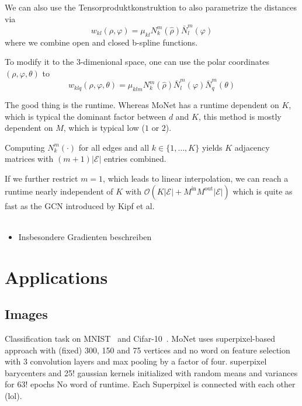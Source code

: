 \documentclass[pdftex,10pt,a4paper]{scrartcl}
\begin{document}
We can also use the Tensorproduktkonstruktion to also parametrize the distances via
\begin{equation*}
  w_{kl}(\rho, \varphi) = \mu_{kl} N_k^m(\hat{\rho}) \bar{N}_l^m(\varphi)
\end{equation*}
where we combine open and closed b-spline functions.

To modify it to the 3-dimenional space, one can use the polar coordinates $(\rho, \varphi, \theta)$ to
\begin{equation*}
  w_{klq}(\rho, \varphi, \theta) = \mu_{klm} N_k^m(\hat{\rho}) \bar{N}_l^m(\varphi) \bar{N}_q^m(\theta)
\end{equation*}

The good thing is the runtime.
Whereas MoNet has a runtime dependent on $K$, which is typical the dominant factor between $d$ and $K$, this method is mostly dependent on $M$, which is typical low ($1$ or $2$).

Computing $N_k^m(\cdot)$ for all edges and all $k \in \{ 1, \ldots, K \}$ yields $K$ adjacency matrices with $(m + 1) |\mathcal{E}|$ entries combined.

If we further restrict $m = 1$, which leads to linear interpolation, we can reach a runtime nearly independent of $K$ with $\mathcal{O}(K |\mathcal{E}| + M^{\mathrm{in}} M^{\mathrm{out}} |\mathcal{E}|)$ which is quite as fast as the GCN introduced by Kipf et al.
\\\\




\begin{itemize}
  \item Insbesondere Gradienten beschreiben
\end{itemize}

\section{Applications}

\subsection{Images}

Classification task on MNIST~\cite{mnist} and Cifar-10~\cite{cifar10}.
MoNet uses superpixel-based approach with (fixed) 300, 150 and 75 vertices and no word on feature selection with 3 convolution layers and max pooling by a factor of four.
superpixel barycenters and 25! gaussian kernels initialized with random means and variances for 63! epochs
No word of runtime.
Each Superpixel is connected with each other (lol).
\end{document}
